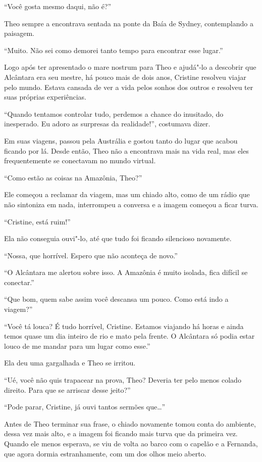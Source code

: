 ``Você gosta mesmo daqui, não é?''

Theo sempre a encontrava sentada na ponte da Baía de Sydney,
contemplando a paisagem.

``Muito. Não sei como demorei tanto tempo para encontrar esse lugar.''

Logo após ter apresentado o mare nostrum para Theo e ajudá"-lo a
descobrir que Alcântara era seu mestre, há pouco mais de dois anos,
Cristine resolveu viajar pelo mundo. Estava cansada de ver a vida
pelos sonhos dos outros e resolveu ter suas próprias experiências.

``Quando tentamos controlar tudo, perdemos a chance do inusitado, do
inesperado. Eu adoro as surpresas da realidade!'', costumava dizer.

Em suas viagens, passou pela Austrália e gostou tanto do lugar que
acabou ficando por lá. Desde então, Theo não a encontrava mais na vida
real, mas eles frequentemente se conectavam no mundo virtual.

``Como estão as coisas na Amazônia, Theo?''

Ele começou a reclamar da viagem, mas um chiado alto, como de um rádio
que não sintoniza em nada, interrompeu a conversa e a imagem começou a
ficar turva.

``Cristine, está ruim!''

Ela não conseguia ouvi"-lo, até que tudo foi ficando silencioso novamente.

``Nossa, que horrível. Espero que não aconteça de novo.''

``O Alcântara me alertou sobre isso. A Amazônia é muito isolada, fica
difícil se conectar.''

``Que bom, quem sabe assim você descansa um pouco. Como está indo a
viagem?''

``Você tá louca? É tudo horrível, Cristine. Estamos viajando há horas e
ainda temos quase um dia inteiro de rio e mato pela frente. O Alcântara
só podia estar louco de me mandar para um lugar como esse.''

Ela deu uma gargalhada e Theo se irritou.

``Ué, você não quis trapacear na prova, Theo? Deveria ter pelo menos
colado direito. Para que se arriscar desse jeito?''

``Pode parar, Cristine, já ouvi tantos sermões que\ldots{}''

Antes de Theo terminar sua frase, o chiado novamente tomou conta do
ambiente, dessa vez mais alto, e a imagem foi ficando mais turva que da
primeira vez. Quando ele menos esperava, se viu de volta ao barco com o
capelão e a Fernanda, que agora dormia estranhamente, com um dos olhos
meio aberto.

